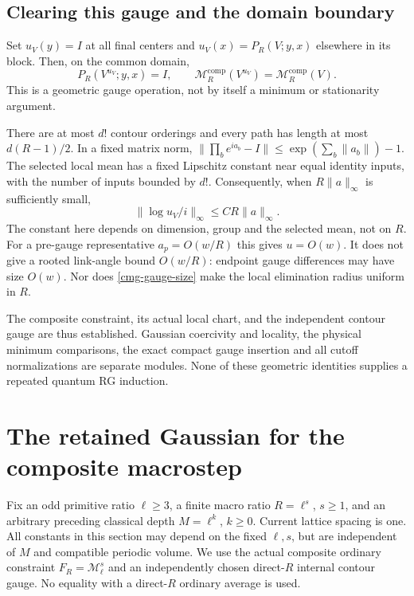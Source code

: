\documentclass[11pt]{article}
\theoremstyle{remark}
\begin{document}
\subsection{Clearing this gauge and the domain boundary}
\label{cmg-clearing-section}

Set $u_V(y)=I$ at all final centers and
$u_V(x)=P_R(V;y,x)$ elsewhere in its block. Then, on the common
domain,
\begin{equation}
 P_R(V^{u_V};y,x)=I,\qquad
 \mathcal M_R^{\mathrm{comp}}(V^{u_V})
       =\mathcal M_R^{\mathrm{comp}}(V).
 \label{cmg-clearing}
\end{equation}
This is a geometric gauge operation, not by itself a minimum or
stationarity argument.

There are at most $d!$ contour orderings and every path has length
at most $d(R-1)/2$. In a fixed matrix norm,
$\lVert\prod_b e^{ia_b}-I\rVert\le
\exp(\sum_b\lVert a_b\rVert)-1$. The selected local mean has a
fixed Lipschitz constant near equal identity inputs, with the number
of inputs bounded by $d!$. Consequently, when $R\lVert a\rVert_\infty$
is sufficiently small,
\begin{equation}
 \lVert\log u_V/i\rVert_\infty
       \le C R\lVert a\rVert_\infty.
 \label{cmg-gauge-size}
\end{equation}
The constant here depends on dimension, group and the selected mean,
not on $R$. For a pre-gauge representative
$a_p=O(w/R)$ this gives $u=O(w)$. It does not give a rooted link-angle
bound $O(w/R)$: endpoint gauge differences may have size $O(w)$.
Nor does \eqref{cmg-gauge-size} make the local elimination radius
uniform in $R$.

The composite constraint, its actual local chart, and the independent
contour gauge are thus established. Gaussian coercivity and locality,
the physical minimum comparisons, the exact compact gauge insertion
and all cutoff normalizations are separate modules. None of these
geometric identities supplies a repeated quantum RG induction.

\section{The retained Gaussian for the composite macrostep}
\label{cmq-section}

Fix an odd primitive ratio $\ell\geq3$, a finite macro ratio
$R=\ell^s$, $s\geq1$, and an arbitrary preceding classical depth
$M=\ell^k$, $k\geq0$. Current lattice spacing is one. All constants
in this section may depend on the fixed $\ell,s$, but are independent
of $M$ and compatible periodic volume. We use the actual composite
ordinary constraint $F_R=\mathcal M_\ell^s$ and an independently chosen
direct-$R$ internal contour gauge. No equality with a direct-$R$
ordinary average is used.
\end{document}
